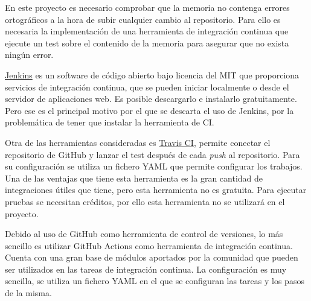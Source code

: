 En este proyecto es necesario comprobar que la memoria no contenga errores ortográficos a la hora de subir cualquier cambio al repositorio. Para ello es necesaria la implementación de una herramienta de integración continua que ejecute un test sobre el contenido de la memoria para asegurar que no exista ningún error.

\href{}{Jenkins} es un software de código abierto bajo licencia del MIT que proporciona servicios de integración continua, que se pueden iniciar localmente o desde el servidor de aplicaciones web. Es posible descargarlo e instalarlo gratuitamente. Pero ese es el principal motivo por el que se descarta el uso de Jenkins, por la problemática de tener que instalar la herramienta de CI. \cite{virtanen2021comparing}

Otra de las herramientas consideradas es \href{https://www.travis-ci.com/}{Travis CI}, permite conectar el repositorio de GitHub y lanzar el test después de cada \emph{push} al repositorio. Para su configuración se utiliza un fichero YAML que permite configurar los trabajos. Una de las ventajas que tiene esta herramienta es la gran cantidad de integraciones útiles que tiene, pero esta herramienta no es gratuita. Para ejecutar pruebas se necesitan créditos, por ello esta herramienta no se utilizará en el proyecto. 

Debido al uso de GitHub como herramienta de control de versiones, lo más sencillo es utilizar GitHub Actions como herramienta de integración continua. Cuenta con una gran base de módulos aportados por la comunidad que pueden ser utilizados en las tareas de integración continua. La configuración es muy sencilla, se utiliza un fichero YAML en el que se configuran las tareas y los pasos de la misma. 





